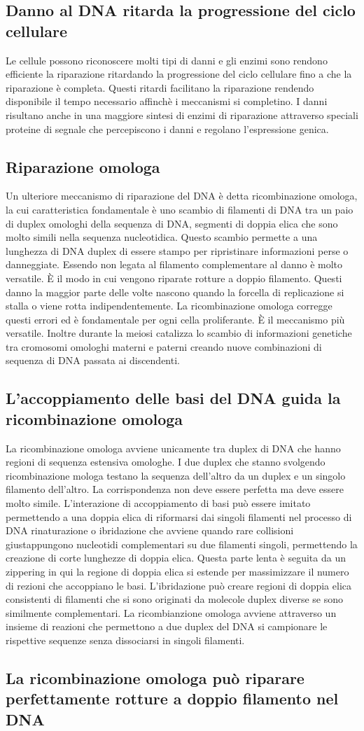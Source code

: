 \subsection{Danno al DNA ritarda la progressione del ciclo cellulare}
Le cellule possono riconoscere molti tipi di danni e gli enzimi sono rendono efficiente la riparazione ritardando la progressione del ciclo cellulare fino a che la riparazione \`e 
completa. Questi ritardi facilitano la riparazione rendendo disponibile il tempo necessario affinch\`e i meccanismi si completino. I danni risultano anche in una maggiore sintesi di 
enzimi di riparazione attraverso speciali proteine di segnale che percepiscono i danni e regolano l'espressione genica. 
\subsection{Riparazione omologa}
Un ulteriore meccanismo di riparazione del DNA \`e detta ricombinazione omologa, la cui caratteristica fondamentale \`e uno scambio di filamenti di DNA tra un paio di duplex omologhi
della sequenza di DNA, segmenti di doppia elica che sono molto simili nella sequenza nucleotidica. Questo scambio permette a una lunghezza di DNA duplex di essere stampo per 
ripristinare informazioni perse o danneggiate. Essendo non legata al filamento complementare al danno \`e molto versatile. \`E il modo in cui vengono riparate rotture a doppio filamento.
Questi danno la maggior parte delle volte nascono quando la forcella di replicazione si stalla o viene rotta indipendentemente. La ricombinazione omologa corregge questi errori ed \`e
fondamentale per ogni cella proliferante. \`E il meccanismo pi\`u versatile. Inoltre durante la meiosi catalizza lo scambio di informazioni genetiche tra cromosomi omologhi materni e 
paterni creando nuove combinazioni di sequenza di DNA passata ai discendenti. 
\subsection{L'accoppiamento delle basi del DNA guida la ricombinazione omologa}
La ricombinazione omologa avviene unicamente tra duplex di DNA che hanno regioni di sequenza estensiva omologhe. I due duplex che stanno svolgendo ricombinazione mologa testano la 
sequenza dell'altro  da un duplex e un singolo filamento dell'altro. La corrispondenza non deve essere perfetta ma deve essere molto simile. L'interazione di accoppiamento di basi
pu\`o essere imitato permettendo a una doppia elica di riformarsi dai singoli filamenti nel processo di DNA rinaturazione o ibridazione che avviene quando rare collisioni giustappungono
nucleotidi complementari su due filamenti singoli, permettendo la creazione di corte lunghezze di doppia elica. Questa parte lenta \`e seguita da un zippering in qui la regione di doppia
elica si estende per massimizzare il numero di rezioni che accoppiano le basi. L'ibridazione pu\`o creare regioni di doppia elica consistenti di filamenti che si sono originati da 
molecole duplex diverse se sono similmente complementari. La ricombianzione omologa avviene attraverso un insieme di reazioni che permettono a due duplex del DNA si campionare le 
rispettive sequenze senza dissociarsi in singoli filamenti. 
\subsection{La ricombinazione omologa pu\`o riparare perfettamente rotture a doppio filamento nel DNA}


